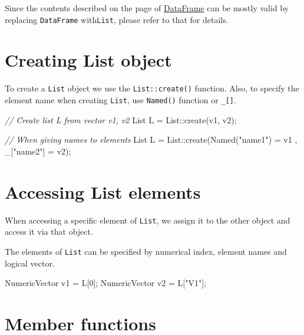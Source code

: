 \documentclass[]{book}
\newenvironment{Shaded}{\begin{snugshade}}{\end{snugshade}}
\newcommand{\CommentTok}[1]{\textcolor[rgb]{0.56,0.35,0.01}{\textit{#1}}}
\newcommand{\DecValTok}[1]{\textcolor[rgb]{0.00,0.00,0.81}{#1}}
\newcommand{\NormalTok}[1]{#1}
\newcommand{\StringTok}[1]{\textcolor[rgb]{0.31,0.60,0.02}{#1}}
\begin{document}
Since the contents described on the page of \href{dataframe.md}{DataFrame} can be mostly valid by replacing \texttt{DataFrame} with\texttt{List}, please refer to that for details.

\hypertarget{creating-list-object}{%
\section{Creating List object}\label{creating-list-object}}

To create a \texttt{List} object we use the \texttt{List::create()} function. Also, to specify the element name when creating \texttt{List}, use \texttt{Named()} function or \texttt{\_{[}{]}}.

\begin{Shaded}
\begin{Highlighting}[]
\CommentTok{// Create list L from vector v1, v2}
\NormalTok{List L = List::create(v1, v2);}

\CommentTok{// When giving names to elements}
\NormalTok{List L = List::create(Named(}\StringTok{"name1"}\NormalTok{) = v1 , _[}\StringTok{"name2"}\NormalTok{] = v2);}
\end{Highlighting}
\end{Shaded}

\hypertarget{accessing-list-elements}{%
\section{Accessing List elements}\label{accessing-list-elements}}

When accessing a specific element of \texttt{List}, we assign it to the other object and access it via that object.

The elements of \texttt{List} can be specified by numerical index, element names and logical vector.

\begin{Shaded}
\begin{Highlighting}[]
\NormalTok{NumericVector v1 = L[}\DecValTok{0}\NormalTok{];}
\NormalTok{NumericVector v2 = L[}\StringTok{"V1"}\NormalTok{];}
\end{Highlighting}
\end{Shaded}

\hypertarget{member-functions-3}{%
\section{Member functions}\label{member-functions-3}}
\end{document}
